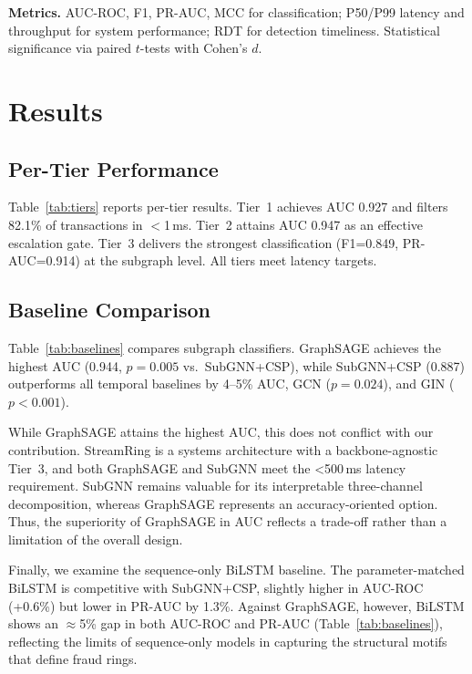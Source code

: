 \documentclass[sigconf, anonymous, review]{acmart}
\begin{document}
\textbf{Metrics.} AUC-ROC, F1, PR-AUC, MCC for classification; P50/P99 latency and throughput for system performance; RDT for detection timeliness. Statistical significance via paired $t$-tests with Cohen's $d$.

\section{Results}
\label{sec:results}

\subsection{Per-Tier Performance}

Table~\ref{tab:tiers} reports per-tier results. Tier~1 achieves AUC 0.927 and filters 82.1\% of transactions in $<$1\,ms. Tier~2 attains AUC 0.947 as an effective escalation gate. Tier~3 delivers the strongest classification (F1=0.849, PR-AUC=0.914) at the subgraph level. All tiers meet latency targets.



\subsection{Baseline Comparison}



Table~\ref{tab:baselines} compares subgraph classifiers. GraphSAGE achieves the highest AUC (0.944, $p{=}0.005$ vs.\ SubGNN+CSP), while SubGNN+CSP (0.887) outperforms all temporal baselines by 4--5\% AUC, GCN ($p{=}0.024$), and GIN ($p{<}0.001$).

While GraphSAGE attains the highest AUC, this does not conflict with our contribution. StreamRing is a systems architecture with a backbone-agnostic Tier~3, and both GraphSAGE and SubGNN meet the <500\,ms latency requirement. SubGNN remains valuable for its interpretable three-channel decomposition, whereas GraphSAGE represents an accuracy-oriented option. Thus, the superiority of GraphSAGE in AUC reflects a trade-off rather than a limitation of the overall design.

Finally, we examine the sequence-only BiLSTM baseline. The parameter-matched BiLSTM is competitive with SubGNN+CSP, slightly higher in AUC-ROC (+0.6\%) but lower in PR-AUC by 1.3\%. Against GraphSAGE, however, BiLSTM shows an $\approx$5\% gap in both AUC-ROC and PR-AUC (Table~\ref{tab:baselines}), reflecting the limits of sequence-only models in capturing the structural motifs that define fraud rings.
\end{document}

